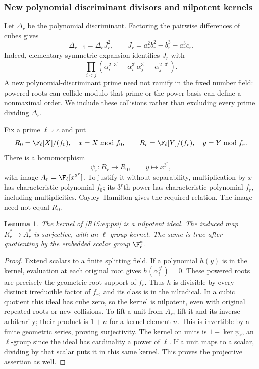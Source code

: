 \documentclass[11pt,a4paper]{article}
\newtheorem{lemma}[theorem]{Lemma}\newtheorem{proposition}[theorem]{Proposition}
\theoremstyle{definition}\newtheorem{definition}[theorem]{Definition}
\theoremstyle{remark}\newtheorem{remark}[theorem]{Remark}
\begin{document}
\subsubsection{New polynomial discriminant divisors and nilpotent kernels}

Let $\Delta_r$ be the polynomial discriminant. Factoring the
pairwise differences of cubes gives
\begin{equation}\label{R15:eq:discriminant-map}
 \Delta_{r+1}=\Delta_r J_r^2,\qquad
 J_r=a_r^2b_r^2-b_r^3-a_r^3c_r.
\end{equation}
Indeed, elementary symmetric expansion identifies $J_r$ with
\[
 \prod_{i<j}(\alpha_i^{2\cdot3^r}
 +\alpha_i^{3^r}\alpha_j^{3^r}+\alpha_j^{2\cdot3^r}).
\]
A new polynomial-discriminant prime need not ramify in the fixed
number field: powered roots can collide modulo that prime or the
power basis can define a nonmaximal order. We include these collisions
rather than excluding every prime dividing $\Delta_r$.

Fix a prime $\ell\nmid c$ and put
\[
 R_0=\F_\ell[X]/(f_0),\quad x=X\bmod f_0,
 \qquad R_r=\F_\ell[Y]/(f_r),\quad y=Y\bmod f_r.
\]
There is a homomorphism
\begin{equation}\label{R15:eq:psi}
 \psi_r:R_r\longrightarrow R_0,\qquad y\longmapsto x^{3^r},
\end{equation}
with image $A_r=\F_\ell[x^{3^r}]$. To justify it without
separability, multiplication by $x$ has characteristic polynomial
$f_0$; its $3^r$th power has characteristic polynomial $f_r$,
including multiplicities. Cayley--Hamilton gives the required relation.
The image need not equal $R_0$.

\begin{lemma}\label{R15:lem:nilkernel}
The kernel of \eqref{R15:eq:psi} is a nilpotent ideal. The induced map
$R_r^*\to A_r^*$ is surjective, with an $\ell$-group kernel.
The same is true after quotienting by the embedded scalar group
$\F_\ell^*$.
\end{lemma}
\begin{proof}
Extend scalars to a finite splitting field. If a polynomial $h(y)$
is in the kernel, evaluation at each original root gives
$h(\alpha_i^{3^r})=0$. These powered roots are precisely the
geometric root support of $f_r$. Thus $h$ is divisible by every
distinct irreducible factor of $f_r$, and its class is in the
nilradical. In a cubic quotient this ideal has cube zero, so the
kernel is nilpotent, even with original repeated roots or new collisions.
To lift a unit from $A_r$, lift it and its inverse arbitrarily;
their product is $1+n$ for a kernel element $n$. This is invertible
by a finite geometric series, proving surjectivity. The kernel on
units is $1+\ker\psi_r$, an $\ell$-group since the ideal has
cardinality a power of $\ell$. If a unit maps to a scalar, dividing
by that scalar puts it in this same kernel. This proves the
projective assertion as well.
\end{proof}
\end{document}
